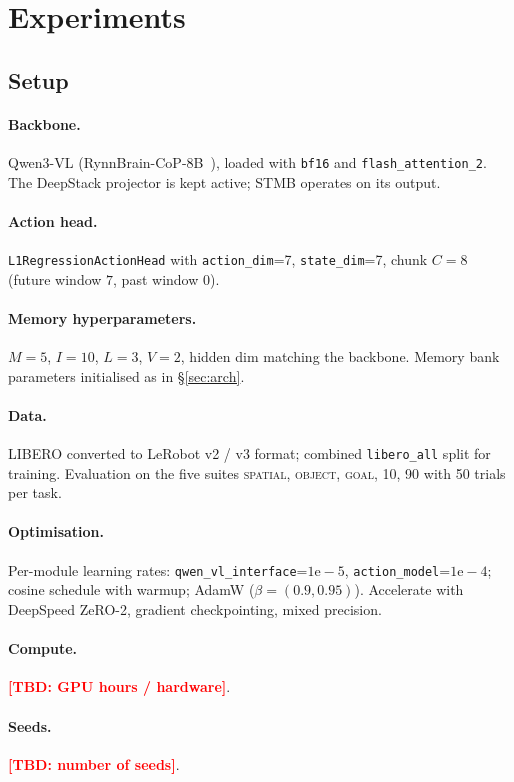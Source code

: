 \documentclass[11pt]{article}
\newcommand{\todo}[1]{\textcolor{red}{\textbf{[TBD: #1]}}}
\begin{document}
\section{Experiments}
\label{sec:exp}

\subsection{Setup}

\paragraph{Backbone.} Qwen3-VL (RynnBrain-CoP-8B~\cite{alibaba2025rynnbrain}),
loaded with \texttt{bf16} and \texttt{flash\_attention\_2}. The DeepStack
projector is kept active; STMB operates on its output.

\paragraph{Action head.} \texttt{L1RegressionActionHead} with
\texttt{action\_dim}=7, \texttt{state\_dim}=7, chunk $C{=}8$
(future window $7$, past window $0$).

\paragraph{Memory hyperparameters.} $M{=}5$, $I{=}10$, $L{=}3$, $V{=}2$,
hidden dim matching the backbone. Memory bank parameters initialised as in
\S\ref{sec:arch}.

\paragraph{Data.} LIBERO converted to LeRobot v2 / v3 format; combined
\texttt{libero\_all} split for training. Evaluation on the five suites
\textsc{spatial}, \textsc{object}, \textsc{goal}, \textsc{10}, \textsc{90}
with 50 trials per task.

\paragraph{Optimisation.} Per-module learning rates:
\texttt{qwen\_vl\_interface}=$1\mathrm{e}{-}5$,
\texttt{action\_model}=$1\mathrm{e}{-}4$;
cosine schedule with warmup; AdamW ($\beta{=}(0.9, 0.95)$). Accelerate with
DeepSpeed ZeRO-2, gradient checkpointing, mixed precision.

\paragraph{Compute.} \todo{GPU hours / hardware}. \paragraph{Seeds.}
\todo{number of seeds}.
\end{document}
